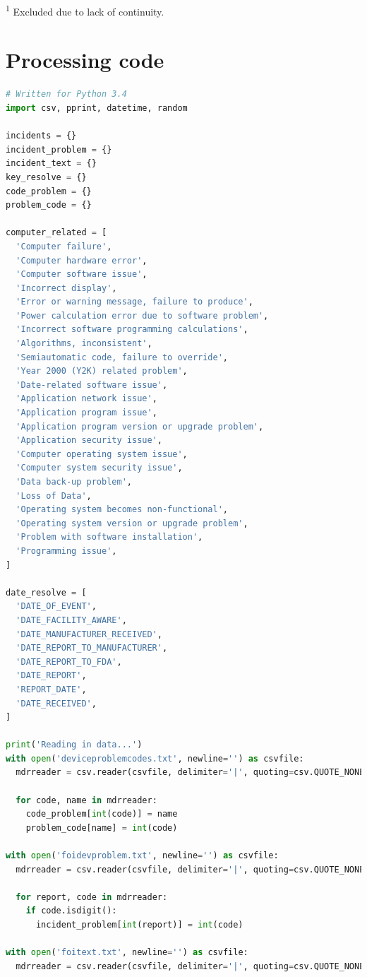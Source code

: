 \documentclass{cshonours}
\begin{document}
\textsuperscript{1} Excluded due to lack of continuity.

\clearpage
\section{Processing code}
\fontsize{10pt}{12pt}\selectfont
\begin{lstlisting}[language=Python]
# Written for Python 3.4
import csv, pprint, datetime, random

incidents = {}
incident_problem = {}
incident_text = {}
key_resolve = {}
code_problem = {}
problem_code = {}

computer_related = [
  'Computer failure',
  'Computer hardware error',
  'Computer software issue',
  'Incorrect display',
  'Error or warning message, failure to produce',
  'Power calculation error due to software problem',
  'Incorrect software programming calculations',
  'Algorithms, inconsistent',
  'Semiautomatic code, failure to override',
  'Year 2000 (Y2K) related problem',
  'Date-related software issue',
  'Application network issue',
  'Application program issue',
  'Application program version or upgrade problem',
  'Application security issue',
  'Computer operating system issue',
  'Computer system security issue',
  'Data back-up problem',
  'Loss of Data',
  'Operating system becomes non-functional',
  'Operating system version or upgrade problem',
  'Problem with software installation',
  'Programming issue',
]

date_resolve = [
  'DATE_OF_EVENT',
  'DATE_FACILITY_AWARE',
  'DATE_MANUFACTURER_RECEIVED',
  'DATE_REPORT_TO_MANUFACTURER',
  'DATE_REPORT_TO_FDA',
  'DATE_REPORT',
  'REPORT_DATE',
  'DATE_RECEIVED',
]

print('Reading in data...')
with open('deviceproblemcodes.txt', newline='') as csvfile:
  mdrreader = csv.reader(csvfile, delimiter='|', quoting=csv.QUOTE_NONE)
  
  for code, name in mdrreader:
    code_problem[int(code)] = name
    problem_code[name] = int(code)    

with open('foidevproblem.txt', newline='') as csvfile:
  mdrreader = csv.reader(csvfile, delimiter='|', quoting=csv.QUOTE_NONE)
  
  for report, code in mdrreader:
    if code.isdigit():
      incident_problem[int(report)] = int(code)    

with open('foitext.txt', newline='') as csvfile:
  mdrreader = csv.reader(csvfile, delimiter='|', quoting=csv.QUOTE_NONE)
  

\end{lstlisting}
\end{document}

